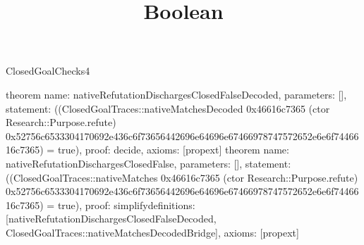\begin{lexlean}{ClosedGoalChecks4}
\title{Boolean}
\begin{semanticmodule}
theorem{
 name: nativeRefutationDischargesClosedFalseDecoded,
 parameters: [],
 statement: ((ClosedGoalTraces::nativeMatchesDecoded 0x46616c7365 (ctor Research::Purpose.refute) 0x52756c6533304170692e436c6f73656442696e64696e67466978747572652e6e6f7446616c7365) = true),
 proof: decide{},
 axioms: [propext]
}
theorem{
 name: nativeRefutationDischargesClosedFalse,
 parameters: [],
 statement: ((ClosedGoalTraces::nativeMatches 0x46616c7365 (ctor Research::Purpose.refute) 0x52756c6533304170692e436c6f73656442696e64696e67466978747572652e6e6f7446616c7365) = true),
 proof: simplify{definitions: [nativeRefutationDischargesClosedFalseDecoded, ClosedGoalTraces::nativeMatchesDecodedBridge]},
 axioms: [propext]
}
\end{semanticmodule}
\end{lexlean}
